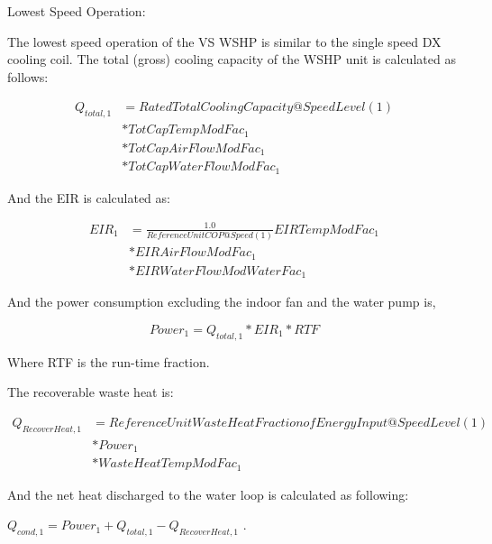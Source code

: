 Lowest Speed Operation:

The lowest speed operation of the VS WSHP is similar to the single speed DX cooling coil. The total (gross) cooling capacity of the WSHP unit is calculated as follows:

\begin{equation}
 \begin{array}{rl}
  Q_{total,1} &= RatedTotalCoolingCapacity@SpeedLevel\left( 1 \right) \\
              &* TotCapTempModFac_1 \\
              &* TotCapAirFlowModFac_1 \\
              &* TotCapWaterFlowModFac_1
 \end{array}
\end{equation}

And the EIR is calculated as:

\begin{equation}
  \begin{array}{rl}
    EIR_1 &= \frac{1.0}{ReferenceUnitCOP@Speed(1)} EIRTempModFac_1 \\
          &* EIRAirFlowModFac_1 \\
          &* EIRWaterFlowModWaterFac_1 
  \end{array}
\end{equation}

And the power consumption excluding the indoor fan and the water pump is,

\begin{equation}
Powe{r_1} = {Q_{total,1}}*EI{R_1}*RTF
\end{equation}

Where RTF is the run-time fraction.

The recoverable waste heat is:

\begin{equation}
  \begin{array}{rl}
    Q_{RecoverHeat,1} &= ReferenceUnitWasteHeatFractionofEnergyInput@SpeedLevel\left( 1 \right) \\
                      &* Power_1 \\
                      &* WasteHeatTempModFac_1
  \end{array}
\end{equation}

And the net heat discharged to the water loop is calculated as following:

\({Q_{cond,1}} = Powe{r_1} + {Q_{total,1}} - {Q_{RecoverHeat,1}}\) .

